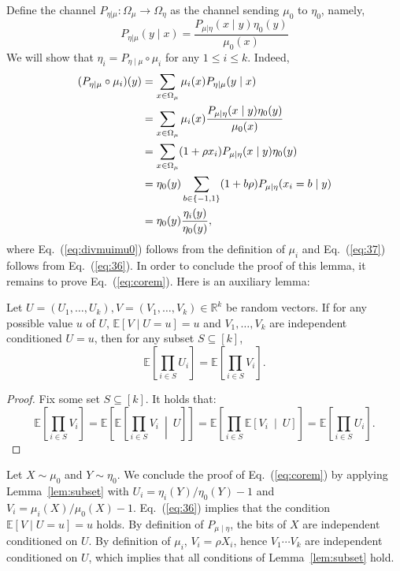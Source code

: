 \documentclass[final, 12pt]{colt2018}
\renewcommand{\eqref}[1]{Eq.~(\ref{#1})}
\newcommand{\lemref}[1]{Lemma~\ref{#1}}
\begin{document}
Define the channel $P_{\eta|\mu} \colon \Omega_\mu \to \Omega_\eta$ as the channel sending $\mu_0$ to $\eta_0$, namely,
\[
P_{\eta | \mu}(y \mid x) = 
\frac{P_{\mu|\eta}(x \mid y) \eta_0(y)}{\mu_0(x)}
\]
We will show that $\eta_i = P_{\eta \mid \mu} \circ \mu_i$ for any $1 \le i \le k$. Indeed,
\begin{align}
(P_{\eta\mid \mu} \circ \mu_i)(y)
&= \sum_{x \in \Omega_\mu} \mu_i(x) P_{\eta|\mu}(y \mid x) \notag \\
&= \sum_{x \in \Omega_\mu} \mu_i(x) \frac{P_{\mu|\eta}(x \mid y) \eta_0(y)}{\mu_0(x)} \nonumber\\
&= \sum_{x \in \Omega_\mu} (1 +\rho x_i) P_{\mu|\eta}(x \mid y) \eta_0(y) \label{eq:divmuimu0}\\
&= \eta_0(y) \sum_{b \in \{-1,1\}} (1 + b \rho) P_{\mu|\eta}(x_i = b \mid y) \nonumber\\
&= \eta_0(y)\frac{\eta_i(y)}{\eta_0(y)}, \label{eq:37}
\end{align}
where \eqref{eq:divmuimu0} follows from the definition of $\mu_i$ and \eqref{eq:37} follows from \eqref{eq:36}. 
In order to conclude the proof of this lemma, it remains to prove \eqref{eq:corem}. Here is an auxiliary lemma:

\begin{lemma} \label{lem:subset}
Let $U= (U_1, \dots, U_k), V=(V_1, \dots, V_k) \in \mathbb{R}^k$ be random vectors. If for any possible value $u$ of $U$, $\mathbb{E}[V \mid U=u] = u$ and $V_1, \dots, V_k$ are independent conditioned $U=u$, then for any subset $S \subseteq [k]$,
\[
\mathbb{E}\left[ \prod_{i \in S} U_i \right]
= \mathbb{E}\left[ \prod_{i \in S} V_i \right].
\]
\end{lemma}

\begin{proof}
Fix some set $S\subseteq [k]$. It holds that:
\[
\mathbb{E}\left[ \prod_{i \in S} V_i \right]
= \mathbb{E}\left[ \mathbb{E}\left[ \prod_{i \in S} V_i ~\middle|~ U \right]\right]
= \mathbb{E}\left[ \prod_{i \in S} \mathbb{E}\left[ V_i ~\middle|~ U \right]\right]
= \mathbb{E}\left[ \prod_{i \in S} U_i \right].
\]
\end{proof}

Let $X \sim \mu_0$ and $Y\sim \eta_0$. We conclude the proof of \eqref{eq:corem} by applying \lemref{lem:subset} with $U_i = \eta_i(Y)/\eta_0(Y)-1$ and $V_i = \mu_i(X)/\mu_0(X)-1$. \eqref{eq:36} implies that the condition $\mathbb{E}[V\mid U=u] = u$ holds. By definition of $P_{\mu \mid \eta}$, the bits of $X$ are independent conditioned on $U$. By definition of $\mu_i$, $V_i = \rho X_i$, hence $V_1 \cdots V_k$ are independent conditioned on $U$, which implies that all conditions of \lemref{lem:subset} hold.
\end{document}
